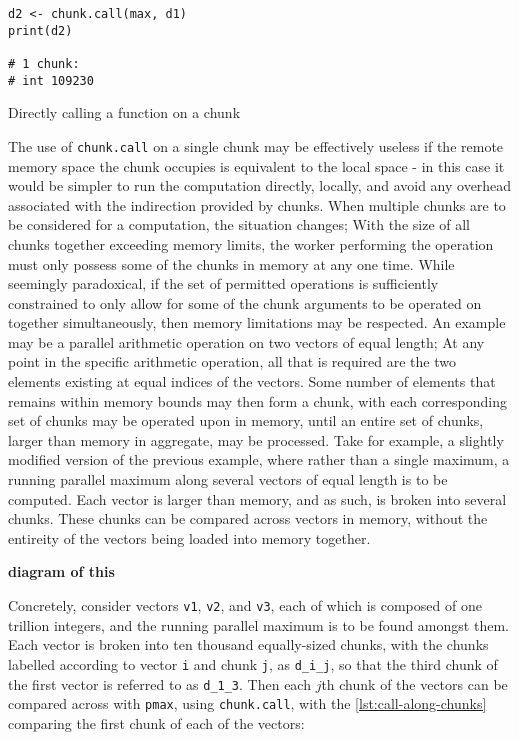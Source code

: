 \begin{listing}
    \begin{verbatim}
d2 <- chunk.call(max, d1)
print(d2)

# 1 chunk:
# int 109230
    \end{verbatim}
    \caption{Directly calling a function on a chunk}
    \label{lst:chunk-call}
\end{listing}

The use of \texttt{chunk.call} on a single chunk may be effectively
useless if the remote memory space the chunk occupies is equivalent to
the local space - in this case it would be simpler to run the
computation directly, locally, and avoid any overhead associated with
the indirection provided by chunks. When multiple chunks are to be
considered for a computation, the situation changes; With the size of
all chunks together exceeding memory limits, the worker performing the
operation must only possess some of the chunks in memory at any one
time. While seemingly paradoxical, if the set of permitted operations is
sufficiently constrained to only allow for some of the chunk arguments
to be operated on together simultaneously, then memory limitations may
be respected. An example may be a parallel arithmetic operation on two
vectors of equal length; At any point in the specific arithmetic
operation, all that is required are the two elements existing at equal
indices of the vectors. Some number of elements that remains within
memory bounds may then form a chunk, with each corresponding set of
chunks may be operated upon in memory, until an entire set of chunks,
larger than memory in aggregate, may be processed. Take for example, a
slightly modified version of the previous example, where rather than a
single maximum, a running parallel maximum along several vectors of
equal length is to be computed. Each vector is larger than memory, and
as such, is broken into several chunks. These chunks can be compared
across vectors in memory, without the entireity of the vectors being
loaded into memory together.

\textbf{diagram of this}

Concretely, consider vectors \texttt{v1}, \texttt{v2}, and \texttt{v3},
each of which is composed of one trillion integers, and the running
parallel maximum is to be found amongst them. Each vector is broken into
ten thousand equally-sized chunks, with the chunks labelled according to
vector \texttt{i} and chunk \texttt{j}, as \texttt{d\_i\_j}, so that the
third chunk of the first vector is referred to as \texttt{d\_1\_3}. Then
each \(j\)th chunk of the vectors can be compared across with
\texttt{pmax}, using \texttt{chunk.call}, with the \cref{lst:call-along-chunks}
comparing the first chunk of each of the vectors:

